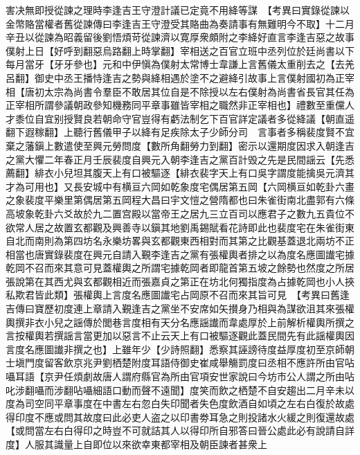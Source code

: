 害决無即授從諫之理時李逢吉王守澄計議已定竟不用絳等謀　【考異曰實錄從諫以金幣賂當權者舊從諫傳曰李逢吉王守澄受其賂曲為奏請事有無難明今不取】十二月辛丑以從諫為昭義留後劉悟煩苛從諫濟以寛厚衆頗附之李絳好直言李逢吉惡之故事僕射上日【好呼到翻惡烏路翻上時掌翻】宰相送之百官立班中丞列位於廷尚書以下每月當牙【牙牙參也】元和中伊愼為僕射太常博士韋謙上言舊儀太重削去之【去羌呂翻】御史中丞王播恃逢吉之勢與絳相遇於塗不之避絳引故事上言僕射國初為正宰相【唐初太宗為尚書令羣臣不敢居其位自是不除授以左右僕射為尚書省長官其任為正宰相所謂參議朝政參知機務同平章事雖皆宰相之職然非正宰相也】禮數至重儻人才黍位自宜别授賢良若朝命守官豈得有虧法制乞下百官詳定議者多從絳議【朝直遥翻下遐稼翻】上聽行舊儀甲子以絳有足疾除太子少師分司　言事者多稱裴度賢不宜棄之藩鎭上數遣使至興元勞問度【數所角翻勞力到翻】密示以還期度因求入朝逢吉之黨大懼二年春正月壬辰裴度自興元入朝李逢吉之黨百計毁之先是民間謡云【先悉薦翻】緋衣小兒坦其腹天上有口被驅逐【緋衣裴字天上有口吳字謂度能擒吳元濟其才為可用也】又長安城中有横亘六岡如乾象度宅偶居第五岡【六岡横亘如乾卦六畫之象裴度平樂里第偶居第五岡程大昌曰宇文愷之營隋都也曰朱雀街南北盡郭有六條高坡象乾卦六爻故於九二置宫殿以當帝王之居九三立百司以應君子之數九五貴位不欲常人居之故置玄都觀及興善寺以鎭其地劉禹錫賦看花詩即此也裴度宅在朱雀街東自北而南則為第四坊名永樂坊畧與玄都觀東西相對而其第之比觀基蓋退北兩坊不正相當也唐實錄裴度在興元自請入覲李逢吉之黨有張權輿者排之以為度名應圖䜟宅據乾岡不召而來其意可見蓋權輿之所謂宅據乾岡者即龍首第五坡之餘勢也然度之所居張說第在其西尤與玄都觀相近而張嘉貞之第正在坊北何獨指度為占據乾岡也小人挾私欺君皆此類】張權輿上言度名應圖䜟宅占岡原不召而來其旨可見　【考異曰舊逢吉傳曰寶歷初度連上章請入覲逢吉之黨坐不安席如矢攅身乃相與為謀欲沮其來張權輿撰非衣小兒之謡傳於閭巷言度相有天分名應謡䜟而韋處厚於上前解析權輿所撰之言按權輿若撰謡言當更加以惡言不止云天上有口被驅逐觀此蓋民間先有此謡權輿因言度名應圖䜟非撰之也】上雖年少【少詩照翻】悉察其誣謗待度益厚度初至京師朝士塡門度留客飲京兆尹劉栖楚附度耳語侍御史崔咸舉觴罰度曰丞相不應許所由官呫囁耳語【京尹任煩劇故唐人謂府縣官為所由官項安世家說曰今坊市公人謂之所由呫叱涉翻囁而涉翻呫囁細語口動而聲不遠聞】度笑而飲之栖楚不自安趨出二月辛未以度為司空同平章事度在中書左右忽白失印聞者失色度飲酒自如頃之左右白復於故處得印度不應或問其故度曰此必吏人盗之以印書劵耳急之則投諸水火緩之則復還故處【或問當左右白得印之時豈不可就詰其人以得印所自邪答曰晉公處此必有說請自詳度】人服其識量上自即位以來欲幸東都宰相及朝臣諫者甚衆上


